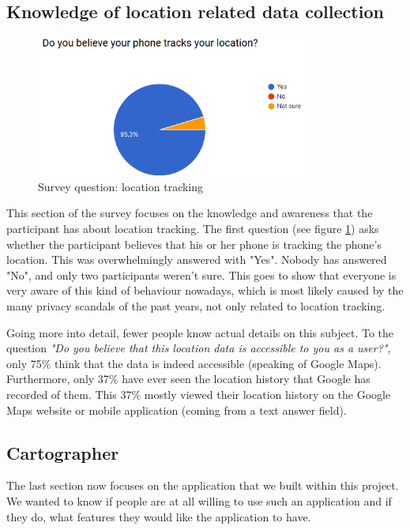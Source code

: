 \documentclass[12p]{article}
\begin{document}
\subsection{Knowledge of location related data collection}

\begin{figure}[ht]
  \center
  \includegraphics[width=0.8\textwidth]{survey/survey1}
  \caption{Survey question: location tracking}
  \label{fig:survey_location_tracking}
\end{figure}

This section of the survey focuses on the knowledge and awareness that the participant has about location tracking. The first question (see figure \ref{fig:survey_location_tracking}) asks whether the participant believes that his or her phone is tracking the phone's location. This was overwhelmingly answered with "Yes". Nobody has answered "No", and only two participants weren't sure. This goes to show that everyone is very aware of this kind of behaviour nowadays, which is most likely caused by the many privacy scandals of the past years, not only related to location tracking.

Going more into detail, fewer people know actual details on this subject. To the question \textit{"Do you believe that this location data is accessible to you as a user?"}, only 75\% think that the data is indeed accessible (speaking of Google Maps). Furthermore, only 37\% have ever seen the location history that Google has recorded of them. This 37\% mostly viewed their location history on the Google Maps website or mobile application (coming from a text answer field).

\subsection{Cartographer}

The last section now focuses on the application that we built within this project. We wanted to know if people are at all willing to use such an application and if they do, what features they would like the application to have.
\end{document}
